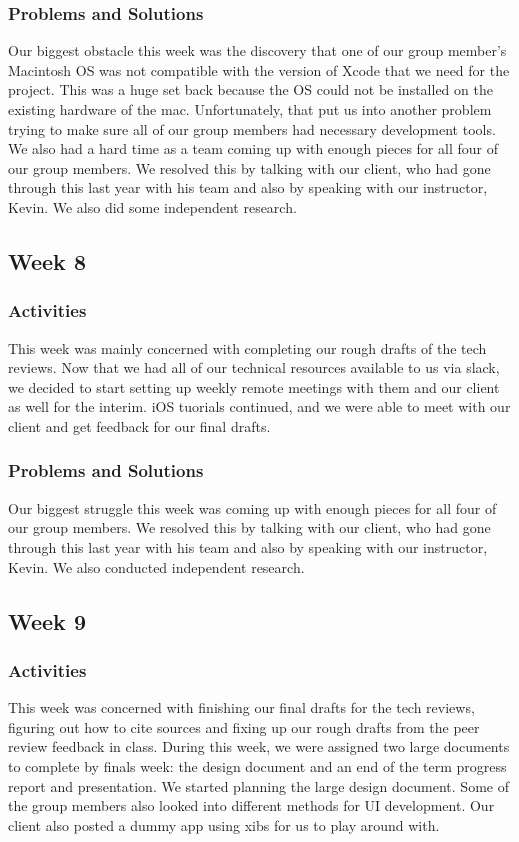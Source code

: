 \documentclass[onecolumn, draftclsnofoot,10pt, compsoc]{IEEEtran}
\begin{document}
\subsubsection{Problems and Solutions}
Our biggest obstacle this week was the discovery that one of our group member’s Macintosh OS was not compatible with the version of Xcode that we need for the project. This was a huge set back because the OS could not be installed on the existing hardware of the mac. Unfortunately, that put us into another problem trying to make sure all of our group members had necessary development tools. We also had a hard time as a team coming up with enough pieces for all four of our group members. We resolved this by talking with our client, who had gone through this last year with his team and also by speaking with our instructor, Kevin. We also did some independent research.

\subsection{Week 8}
\subsubsection{Activities}
This week was mainly concerned with completing our rough drafts of the tech reviews. Now that we had all of our technical resources available to us via slack, we decided to start setting up weekly remote meetings with them and our client as well for the interim. iOS tuorials continued, and we were able to meet with our client and get feedback for our final drafts.

\subsubsection{Problems and Solutions}
Our biggest struggle this week was coming up with enough pieces for all four of our group members. We resolved this by talking with our client, who had gone through this last year with his team and also by speaking with our instructor, Kevin. We also conducted independent research.

\subsection{Week 9}
\subsubsection{Activities}
This week was concerned with finishing our final drafts for the tech reviews, figuring out how to cite sources and fixing up our rough drafts from the peer review feedback in class. During this week, we  were assigned two large documents to complete by finals week:  the design document and an end of the term progress report and presentation. We started planning the large design document. Some of the group members also looked into different methods for UI development. Our client also posted a dummy app using xibs for us to play around with. 
\end{document}

